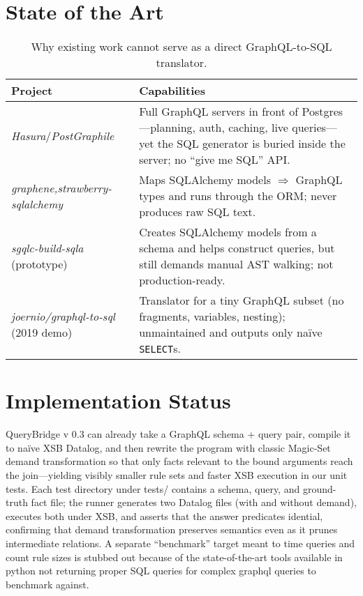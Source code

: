 \documentclass[11pt]{article}
\begin{document}
\section{State of the Art}
\begin{table}[h]
\centering
\renewcommand{\arraystretch}{1.2}
\begin{tabularx}{\textwidth}{@{}lX@{}}
\toprule
\textbf{Project} & \textbf{Capabilities} \\
\midrule
\emph{Hasura}/\emph{PostGraphile} &
Full GraphQL servers in front of Postgres—planning, auth, caching, live queries—yet the SQL generator is buried inside the server; no “give me SQL” API. \\ \addlinespace
\emph{{graphene,strawberry}-sqlalchemy} &
Maps SQLAlchemy models $\Rightarrow$ GraphQL types and runs through the ORM; never produces raw SQL text. \\ \addlinespace
\emph{sgqlc-build-sqla} (prototype) &
Creates SQLAlchemy models from a schema and helps construct queries, but still demands manual AST walking; not production-ready. \\ \addlinespace
\emph{joernio/graphql-to-sql} (2019 demo) &
Translator for a tiny GraphQL subset (no fragments, variables, nesting); unmaintained and outputs only naïve \texttt{SELECT}s. \\
\bottomrule
\end{tabularx}
\caption{Why existing work cannot serve as a direct GraphQL-to-SQL translator.}
\end{table}

\section{Implementation Status}
QueryBridge v 0.3 can already take a GraphQL schema + query pair, compile it to naïve XSB Datalog, and then rewrite the program with classic Magic-Set demand transformation so that only facts relevant to the bound arguments reach the join—yielding visibly smaller rule sets and faster XSB execution in our unit tests. Each test directory under tests/ contains a schema, query, and ground-truth fact file; the runner generates two Datalog files (with and without demand), executes both under XSB, and asserts that the answer predicates idential, confirming that demand transformation preserves semantics even as it prunes intermediate relations. A separate “benchmark” target meant to time queries and count rule sizes is stubbed out because of the state-of-the-art tools available in python not returning proper SQL queries for complex graphql queries to benchmark against.
\end{document}
